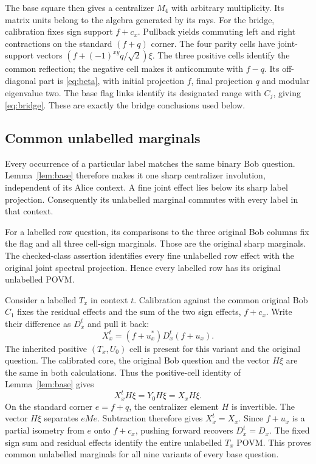 The base square then gives a centralizer $M_4$ with arbitrary multiplicity. Its matrix units belong to the algebra generated by its rays. For the bridge, calibration fixes sign support $f+c_x$. Pullback yields commuting left and right contractions on the standard $(f+q)$ corner. The four parity cells have joint-support vectors $(f+(-1)^{xy}q/\sqrt2)\xi$. The three positive cells identify the common reflection; the negative cell makes it anticommute with $f-q$. Its off-diagonal part is \eqref{eq:beta}, with initial projection $f$, final projection $q$ and modular eigenvalue two. The base flag links identify its designated range with $C_j$, giving \eqref{eq:bridge}. These are exactly the bridge conclusions used below.

\subsection{Common unlabelled marginals}
Every occurrence of a particular label matches the same binary Bob question. Lemma~\ref{lem:base} therefore makes it one sharp centralizer involution, independent of its Alice context. A fine joint effect lies below its sharp label projection. Consequently its unlabelled marginal commutes with every label in that context.

For a labelled row question, its comparisons to the three original Bob columns fix the flag and all three cell-sign marginals. Those are the original sharp marginals. The checked-class assertion identifies every fine unlabelled row effect with the original joint spectral projection. Hence every labelled row has its original unlabelled POVM.

Consider a labelled $T_x$ in context $t$. Calibration against the common original Bob $C_1$ fixes the residual effects and the sum of the two sign effects, $f+c_x$. Write their difference as $D_x^t$ and pull it back:
\[
 X_x^t=(f+u_x^*)D_x^t(f+u_x).
\]
The inherited positive $(T_x,U_0)$ cell is present for this variant and the original question. The calibrated core, the original Bob question and the vector $H\xi$ are the same in both calculations. Thus the positive-cell identity of Lemma~\ref{lem:base} gives
\[
 X_x^tH\xi=Y_0H\xi=X_xH\xi.
\]
On the standard corner $e=f+q$, the centralizer element $H$ is invertible. The vector $H\xi$ separates $eMe$. Subtraction therefore gives $X_x^t=X_x$. Since $f+u_x$ is a partial isometry from $e$ onto $f+c_x$, pushing forward recovers $D_x^t=D_x$. The fixed sign sum and residual effects identify the entire unlabelled $T_x$ POVM. This proves common unlabelled marginals for all nine variants of every base question.

